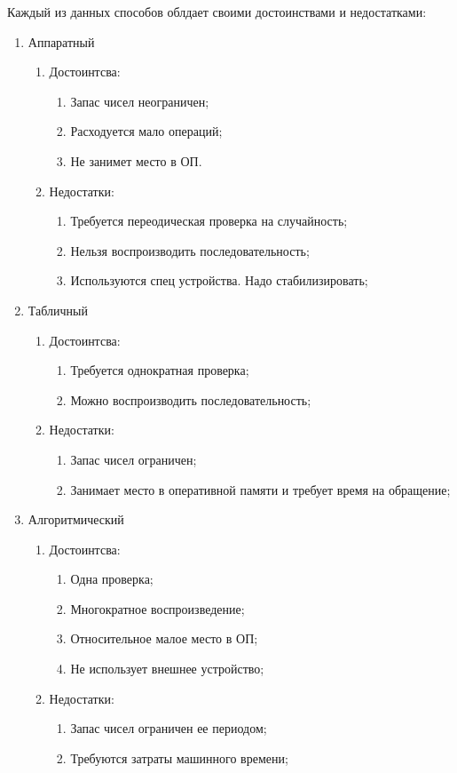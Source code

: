 Каждый из данных способов облдает своими достоинствами и недостатками:
\begin{enumerate}
	\item Аппаратный \begin{enumerate}
		\item Достоинтсва:\begin{enumerate}
			\item Запас чисел неограничен;
			\item Расходуется мало операций;
			\item Не занимет место в ОП.
		\end{enumerate}
		\item Недостатки: \begin{enumerate}
			\item Требуется переодическая проверка на случайность;
			\item Нельзя воспроизводить последовательность;
			\item Используются спец устройства. Надо стабилизировать;
		\end{enumerate}
	\end{enumerate}
	\item Табличный \begin{enumerate}
		\item Достоинтсва: \begin{enumerate}
			\item Требуется однократная проверка;
			\item Можно воспроизводить последовательность;
		\end{enumerate}
		\item Недостатки:\begin{enumerate}
			\item Запас чисел ограничен;
			\item Занимает место в оперативной памяти и требует время на обращение;
		\end{enumerate}
	\end{enumerate}
	\item Алгоритмический \begin{enumerate}
		\item Достоинтсва: \begin{enumerate}
			\item Одна проверка;
			\item Многократное воспроизведение;
			\item Относительное малое место в ОП;
			\item Не использует внешнее устройство;
		\end{enumerate}
		\item Недостатки: \begin{enumerate}
			\item Запас чисел ограничен ее периодом;
			\item Требуются затраты машинного времени;
		\end{enumerate}
	\end{enumerate}
\end{enumerate}

